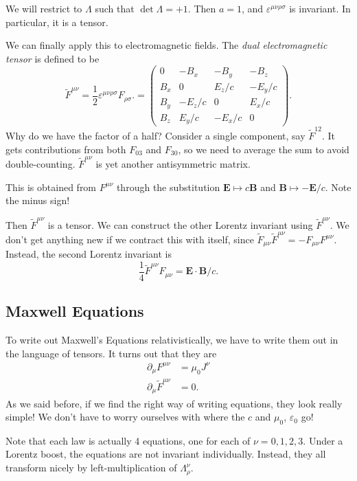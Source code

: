 \documentclass[a4paper]{article}
\begin{document}
We will restrict to $\Lambda$ such that $\det \Lambda = +1$. Then $a = 1$, and $\varepsilon^{\mu\nu\rho\sigma}$ is invariant. In particular, it is a tensor.

We can finally apply this to electromagnetic fields. The \emph{dual electromagnetic tensor} is defined to be
\[
  \tilde{F}^{\mu\nu} = \frac{1}{2}\varepsilon^{\mu\nu\rho\sigma}F_{\rho\sigma}.=
  \begin{pmatrix}
    0 & -B_x & -B_y & -B_z\\
    B_x & 0 & E_z/c & -E_y/c\\
    B_y & -E_z/c & 0 & E_x/c\\
    B_z & E_y/c & -E_x/c & 0
  \end{pmatrix}.
\]
Why do we have the factor of a half? Consider a single component, say $\tilde{F}^{12}$. It gets contributions from both $F_{03}$ and $F_{30}$, so we need to average the sum to avoid double-counting. $\tilde{F}^{\mu\nu}$ is yet another antisymmetric matrix.

This is obtained from $F^{\mu\nu}$ through the substitution $\mathbf{E} \mapsto c\mathbf{B}$ and $\mathbf{B}\mapsto -\mathbf{E}/c$. Note the minus sign!

Then $\tilde{F}^{\mu\nu}$ is a tensor. We can construct the other Lorentz invariant using $\tilde{F}^{\mu\nu}$. We don't get anything new if we contract this with itself, since $\tilde{F}_{\mu\nu}\tilde{F}^{\mu\nu} = -F_{\mu\nu}F^{\mu\nu}$. Instead, the second Lorentz invariant is
\[
  \frac{1}{4}\tilde{F}^{\mu\nu}F_{\mu\nu} = \mathbf{E}\cdot \mathbf{B}/c.
\]
\subsection{Maxwell Equations}
To write out Maxwell's Equations relativistically, we have to write them out in the language of tensors. It turns out that they are
\begin{align*}
  \partial_\mu F^{\mu\nu} &= \mu_0 J^\nu\\
  \partial_\mu \tilde{F}^{\mu\nu} &= 0.
\end{align*}
As we said before, if we find the right way of writing equations, they look really simple! We don't have to worry ourselves with where the $c$ and $\mu_0$, $\varepsilon_0$ go!

Note that each law is actually 4 equations, one for each of $\nu = 0, 1, 2, 3$. Under a Lorentz boost, the equations are not invariant individually. Instead, they all transform nicely by left-multiplication of $\Lambda_\rho^\nu$.
\end{document}
